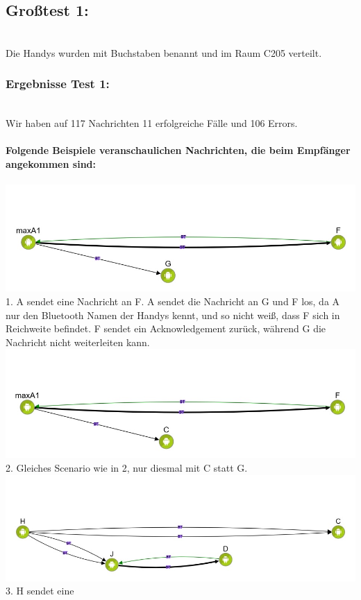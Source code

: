 \subsection{Gro{\ss}test 1:}\label{grosstest-1}
\\
Die Handys wurden mit Buchstaben benannt und im Raum C205 verteilt.
\\
\subsubsection{Ergebnisse Test 1:}\label{ergebnisse-test-1}
\\
Wir haben auf 117 Nachrichten 11 erfolgreiche Fälle und 106 Errors.
\\\\
\textbf{Folgende Beispiele veranschaulichen Nachrichten, die beim
Empfänger angekommen sind:}
\\\\
\includegraphics[width=1.0\textwidth]{belege/grosstests/Bilder/Erfolg4.jpg}\\
1. A sendet eine Nachricht an F. A sendet die Nachricht an G und F los, da A nur den
Bluetooth Namen der Handys kennt, und so nicht weiß, dass F sich in
Reichweite befindet. F sendet ein Acknowledgement zurück, während G die
Nachricht nicht weiterleiten kann.\\
\includegraphics[width=1.0\textwidth]{belege/grosstests/Bilder/Erfolg3.jpg}\\
2. Gleiches Scenario wie in 2, nur diesmal mit C statt G.\\
\includegraphics[width=1.0\textwidth]{belege/grosstests/Bilder/Erfolg2.jpg}\\ 3. H sendet eine
